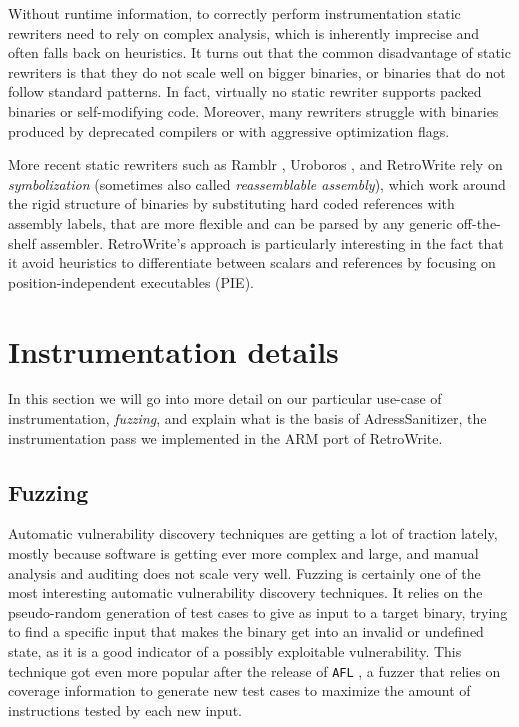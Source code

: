 \documentclass[a4paper,11pt,oneside]{report}
\newcommand{\sysname}{RetroWrite\xspace}
\begin{document}
Without runtime information, to correctly perform instrumentation static 
rewriters need to rely on complex analysis, which is inherently imprecise and 
often falls back on heuristics. It turns out that the common disadvantage of 
static rewriters is that they do not scale well on bigger binaries, or binaries 
that do not follow standard patterns. In fact, virtually no static rewriter 
supports packed binaries or self-modifying code. Moreover, many rewriters 
struggle with binaries produced by deprecated compilers or with aggressive 
optimization flags. 

More recent static rewriters such as Ramblr \cite{ramblr}, Uroboros 
\cite{uroboros}, and \sysname rely on \emph{symbolization} (sometimes also 
called \emph{reassemblable assembly}), which work around the rigid structure of 
binaries by substituting hard coded references with assembly labels, that are 
more flexible and can be parsed by any generic off-the-shelf assembler.  
\sysname's approach is particularly interesting in the fact that it avoid 
heuristics to differentiate between scalars and references by focusing on 
position-independent executables (PIE). 



\section{Instrumentation details}
In this section we will go into more detail on our particular use-case of 
instrumentation, \emph{fuzzing}, and explain what is the basis of 
AdressSanitizer, the instrumentation pass we implemented in the ARM port of 
\sysname. 

\subsection{Fuzzing}
Automatic vulnerability discovery techniques are getting a lot of traction 
lately, mostly because software is getting ever more complex and large, and 
manual analysis and auditing does not scale very well. Fuzzing is certainly one 
of the most interesting automatic vulnerability discovery techniques.  It 
relies on the pseudo-random generation of test cases to give as input to a 
target binary, trying to find a specific input that makes the binary get into 
an invalid or undefined state, as it is a good indicator of a possibly 
exploitable vulnerability. This technique got even more popular after the 
release of \texttt{AFL} \cite{afl}, a fuzzer that relies on coverage  
information to generate new test cases to maximize the amount of instructions 
tested by each new input. 
\end{document}
